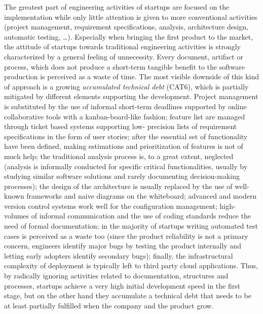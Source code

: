 \documentclass[10pt,journal,letterpaper,compsoc]{IEEEtran}
\begin{document}
\begin{compactitem}
\item The greatest part of engineering activities of startups are focused on the implementation while only little attention is given to more conventional activities (project management, requirement specifications, analysis, architecture design, automatic testing, \ldots). Especially when bringing the first product to the market, the attitude of startups towards traditional engineering activities is strongly characterized by a general feeling of unnecessity. Every document, artifact or process, which does not produce a short-term tangible benefit to the software production is perceived as a waste of time. The most visible downside of this kind of approach is a growing \textit{accumulated technical debt} (CAT6), which is partially mitigated by different elements supporting the development. Project management is substituted by the use of informal short-term deadlines supported by online collaborative tools with a kanban-board-like fashion; feature list are managed through ticket based systems supporting low-
precision lists of requirement specifications in the form of user stories; after the essential set of functionality have been defined, making estimations and prioritization of features is not of much help; the traditional analysis process is, to a great extent, neglected (analysis is informally conducted for specific critical functionalities, usually by studying similar software solutions and rarely documenting decision-making processes); the design of the architecture is usually replaced by the use of well-known frameworks and naive diagrams on the whiteboard; advanced and modern version control systems work well for the configuration management; high-volumes of informal communication and the use of coding standards reduce the need of formal documentation; in the majority of startups writing automated test cases is perceived as a waste too (since the product reliability is not a primary concern,  engineers identify major bugs by testing the product internally and letting early adopters identify secondary 
bugs); finally, the infrastructural complexity of deployment is typically left to third party cloud applications.  Thus, by radically ignoring activities related to documentation, structures and processes, startups achieve a very high initial development speed in the first stage, but on the other hand they accumulate a technical debt that needs to be at least partially fulfilled when the company and the product grow.


\end{compactitem}
\end{document}
